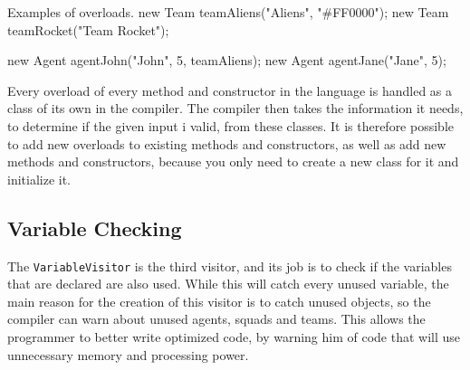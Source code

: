 \begin{source}{Examples of overloads.}{}
	new Team teamAliens("Aliens", "#FF0000");
	new Team teamRocket("Team Rocket");
	
	new Agent agentJohn("John", 5, teamAliens);
	new Agent agentJane("Jane", 5);
\end{source}

Every overload of every method and constructor in the language is handled as a class of its own in the compiler. 
The compiler then takes the information it needs, to determine if the given input i valid, from these classes. 
It is therefore possible to add new overloads to existing methods and constructors, as well as add new methods and constructors, because you only need to create a new class for it and initialize it.

\subsection{Variable Checking}
\label{variabelcheck}
The \texttt{VariableVisitor} is the third visitor, and its job is to check if the variables that are declared are also used. 
While this will catch every unused variable, the main reason for the creation of this visitor is to catch unused objects, so the compiler can warn about unused agents, squads and teams.
This allows the programmer to better write optimized code, by warning him of code that will use unnecessary memory and processing power.